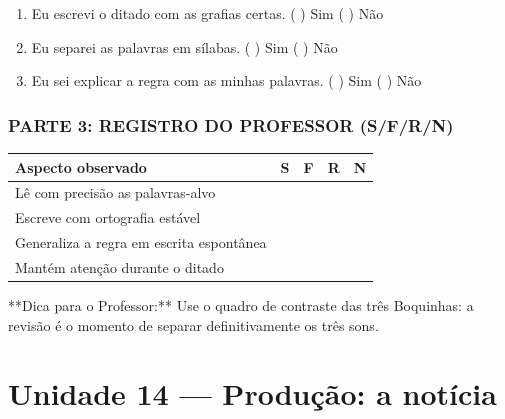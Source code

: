 \begin{exercicio}
\begin{enumerate}[label=\alph*)]
  \item Eu escrevi o ditado com as grafias certas.  \quad ( ) Sim   ( ) Não

  \item Eu separei as palavras em sílabas.  \quad ( ) Sim   ( ) Não

  \item Eu sei explicar a regra com as minhas palavras.  \quad ( ) Sim   ( ) Não

\end{enumerate}

\subsection*{PARTE 3: REGISTRO DO PROFESSOR (S/F/R/N)}

\begin{center}
\renewcommand{\arraystretch}{1.4}
\begin{tabular}{@{}p{9cm}cccc@{}}
\toprule
Aspecto observado & S & F & R & N \\
\midrule
Lê com precisão as palavras-alvo & & & & \\
Escreve com ortografia estável & & & & \\
Generaliza a regra em escrita espontânea & & & & \\
Mantém atenção durante o ditado & & & & \\
\bottomrule\end{tabular}\end{center}

\end{exercicio}

\begin{dica}
**Dica para o Professor:** Use o quadro de contraste das três Boquinhas: a revisão é o momento de separar definitivamente os três sons.
\end{dica}


\chapter{Unidade 14 --- Produção: a notícia}


